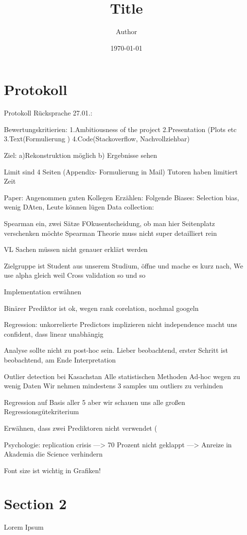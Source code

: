 \documentclass[11pt]{article}
\title{ Title}
\author{ Author }
\date{\today}
\begin{document}
\maketitle	
\pagebreak



\section{Protokoll}
Protokoll Rücksprache 27.01.:

Bewertungskritierien:
1.Ambitiousness of the project
2.Presentation (Plots etc
3.Text(Formulierung )
4.Code(Stackoverflow, Nachvollziehbar)

Ziel:
a)Rekonstruktion möglich
b) Ergebnisse sehen

Limit sind 4 Seiten (Appendix- Formulierung in Mail) Tutoren haben limitiert Zeit

Paper: Angenommen guten Kollegen Erzählen: Folgende Biases: Selection bias, wenig DAten, Leute können lügen
Data collection: 

Spearman ein, zwei Sätze FOkusentscheidung, ob man hier Seitenplatz verschenken möchte
Spearman Theorie muss nicht super detailliert rein

VL Sachen müssen nicht genauer erklärt werden 

Zielgruppe ist Student aus unserem Studium, öffne und mache es kurz nach, We use alpha gleich weil Cross validation so und so

Implementation erwähnen

Binärer Prediktor ist ok, wegen rank corelation, nochmal googeln

Regression: unkorrelierte Predictors implizieren nicht independence macht uns confident, dass linear unabhängig

Analyse sollte nicht zu post-hoc sein. Lieber beobachtend, erster Schritt ist beobachtend, am Ende Interpretation

Outlier detection bei Kasachstan
Alle statistischen Methoden Ad-hoc wegen zu wenig Daten 
Wir nehmen mindestens 3 samples um outliers zu verhinden

Regression auf Basis aller 5 aber wir schauen uns alle großen
Regressionsgütekriterium

Erwähnen, dass zwei Prediktoren nicht verwendet (

Psychologie: replication crisis —> 70 Prozent nicht geklappt —> Anreize in Akademia die Science verhindern

Font size ist wichtig in Grafiken!



\pagebreak
\section{Section 2}
Lorem Ipsum \\

\end{document}
